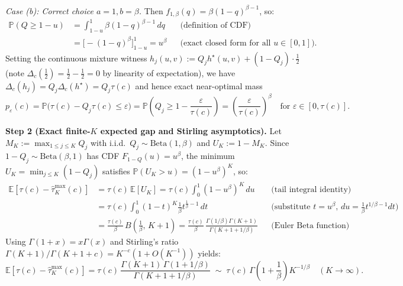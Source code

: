\documentclass[11pt]{article}
\newcommand{\E}{\mathbb{E}}
\newcommand{\Prob}{\mathbb{P}}
\begin{document}
\emph{Case (b): Correct choice $a = 1, b = \beta$.} Then $f_{1,\beta}(q) = \beta (1 - q)^{\beta - 1}$, so:
\begin{align}
\Prob(Q \ge 1 - u)
&= \int_{1-u}^1 \beta (1 - q)^{\beta - 1}\,dq && \text{(definition of CDF)} \nonumber\\
&= \big[-(1-q)^\beta\big]_{1-u}^1 = u^\beta && \text{(exact closed form for all $u \in [0,1]$).}
\end{align}
Setting the continuous mixture witness $h_j(u,v) := Q_j h^\star(u,v) + (1 - Q_j)\cdot \tfrac{1}{2}$ (note $\Delta_c(\tfrac{1}{2}) = \tfrac{1}{2} - \tfrac{1}{2} = 0$ by linearity of expectation), we have $\Delta_c(h_j) = Q_j \Delta_c(h^\star) = Q_j \tau(c)$ and hence exact near-optimal mass
\begin{equation}
p_\varepsilon(c) = \Prob\big(\tau(c) - Q_j\tau(c) \le \varepsilon\big)
= \Prob\!\left(Q_j \ge 1 - \frac{\varepsilon}{\tau(c)}\right)
= \left(\frac{\varepsilon}{\tau(c)}\right)^\beta \quad \text{for } \varepsilon \in [0, \tau(c)].
\end{equation}

\textbf{Step 2 (Exact finite-$K$ expected gap and Stirling asymptotics).}
Let $M_K := \max_{1 \le j \le K} Q_j$ with i.i.d.\ $Q_j \sim \mathrm{Beta}(1,\beta)$ and $U_K := 1 - M_K$. Since $1 - Q_j \sim \mathrm{Beta}(\beta, 1)$ has CDF $F_{1-Q}(u) = u^\beta$, the minimum $U_K = \min_{j \le K}(1 - Q_j)$ satisfies $\Prob(U_K > u) = (1 - u^\beta)^K$, so:
\begin{align}
\E\!\left[\tau(c) - \hat{\tau}_K^{\max}(c)\right]
&= \tau(c)\,\E[U_K] = \tau(c)\int_0^1 (1 - u^\beta)^K\,du && \text{(tail integral identity)} \nonumber\\
&= \tau(c)\int_0^1 (1 - t)^K \frac{1}{\beta} t^{\frac{1}{\beta} - 1}\,dt && \text{(substitute $t = u^\beta$, $du = \tfrac{1}{\beta}t^{1/\beta - 1}dt$)} \nonumber\\
&= \frac{\tau(c)}{\beta}\, B\!\left(\frac{1}{\beta},\, K + 1\right)
= \frac{\tau(c)}{\beta}\,\frac{\Gamma(1/\beta)\Gamma(K+1)}{\Gamma(K + 1 + 1/\beta)} && \text{(Euler Beta function)} \nonumber
\end{align}
Using $\Gamma(1+x) = x\Gamma(x)$ and Stirling's ratio $\Gamma(K+1)/\Gamma(K+1+c) = K^{-c}(1+O(K^{-1}))$ yields:
\begin{equation}
\label{eq:exact_beta_gap}
\boxed{\E\!\left[\tau(c) - \hat{\tau}_K^{\max}(c)\right]
= \tau(c)\,\frac{\Gamma(K+1)\,\Gamma(1 + 1/\beta)}{\Gamma(K + 1 + 1/\beta)}
\;\sim\; \tau(c)\,\Gamma\!\left(1 + \frac{1}{\beta}\right) K^{-1/\beta} \quad (K \to \infty).}
\end{equation}
\end{document}
